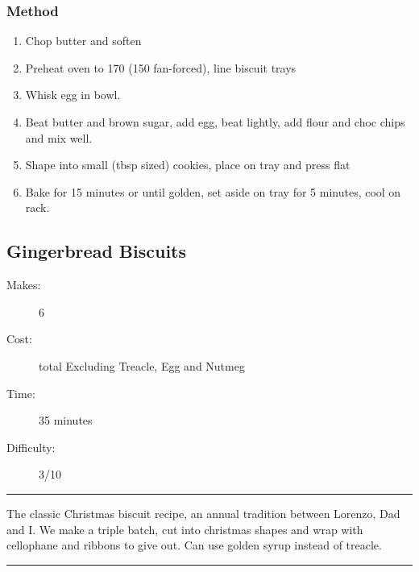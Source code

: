 \documentclass[]{article}
\begin{document}
\subsubsection*{\Large Method}
\begin{enumerate}[font=\huge\color{accent}]
	\item Chop butter and soften
	\item Preheat oven to 170 (150 fan-forced), line biscuit trays
	\item Whisk egg in bowl.
	\item Beat butter and brown sugar, add egg, beat lightly, add flour and choc chips and mix well.
	\item Shape into small (tbsp sized) cookies, place on tray and press flat
	\item Bake for 15 minutes or until golden, set aside on tray for 5 minutes, cool on rack.
\end{enumerate}
\newpage
{}\label{rec:Gingerbread Biscuits}
\subsection*{\center\huge Gingerbread Biscuits}
\begin{description}
\item[Makes:] 6 
\item[Cost:]  total Excluding Treacle, Egg and Nutmeg
\item[Time:] 35 minutes
\item[Difficulty:] 3/10
\end{description}
\vspace{0.2cm}\hrule\vspace{0.5cm}
\begin{adjustwidth}{0.5 cm}{0.5 cm}

The classic Christmas biscuit recipe, an annual tradition between Lorenzo, Dad and I. We make a triple batch, cut into christmas shapes and wrap with cellophane and ribbons to give out. Can use golden syrup instead of treacle. \hfill{}\color{black}

\end{adjustwidth}
\vspace{0.5cm}\hrule
\end{document}
